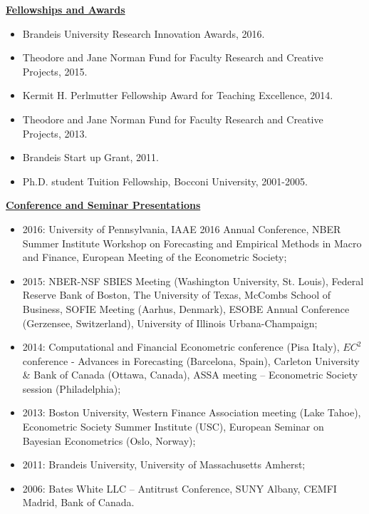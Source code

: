 \documentclass[12pt]{article}
\begin{document}
\underline{\textbf{Fellowships and Awards}}\\
\begin{itemize}
\item Brandeis University Research Innovation Awards, 2016. 
\item Theodore and Jane Norman Fund for Faculty Research and Creative Projects, 2015. 
\item Kermit H. Perlmutter Fellowship Award for Teaching Excellence, 2014. 
\item Theodore and Jane Norman Fund for Faculty Research and Creative Projects, 2013. 
\item Brandeis Start up Grant, 2011. 
\item Ph.D. student Tuition Fellowship, Bocconi University, 2001-2005.
\end{itemize}
\underline{\textbf{Conference and Seminar Presentations}}
\begin{itemize}
	\item 2016: University of Pennsylvania, IAAE 2016 Annual Conference, NBER Summer Institute Workshop on Forecasting and Empirical Methods in Macro and Finance, European Meeting of the Econometric Society;
  \item 2015: NBER-NSF SBIES Meeting (Washington University, St. Louis), Federal Reserve Bank of Boston, The University of Texas, McCombs School of Business, SOFIE Meeting (Aarhus, Denmark), ESOBE Annual Conference (Gerzensee, Switzerland), University of Illinois Urbana-Champaign;
	\item 2014: Computational and Financial Econometric conference (Pisa Italy), $EC^2$ conference - Advances in Forecasting (Barcelona, Spain),  Carleton University & Bank of Canada (Ottawa, Canada), ASSA meeting -- Econometric Society session (Philadelphia);  
	\item 2013: Boston University, Western Finance Association meeting (Lake Tahoe), Econometric Society Summer Institute (USC), European Seminar on Bayesian Econometrics (Oslo, Norway); 
	\item 2011: Brandeis University, University of Massachusetts Amherst; 
	\item 2006: Bates White LLC -- Antitrust Conference, SUNY Albany, CEMFI Madrid, Bank of Canada.
\end{itemize}
\end{document}
